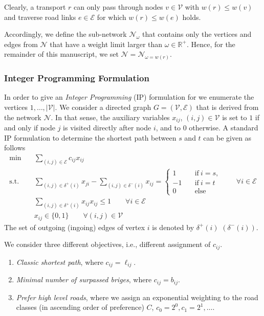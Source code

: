 Clearly, a transport $r$ can only pass through nodes $v \in \mathcal{V}$ with
$w(r) \leq w(v)$ and traverse road links $e \in \mathcal{E}$ for which $w(r) \leq w(e)$ holds.

Accordingly, we define the sub-network $\mathcal{N}_{\omega}$ that contains only the vertices and edges from $\mathcal{N}$ that have a weight limit larger than $\omega \in \mathbb{R}^{+}$.
Hence, for the remainder of this manuscript, we set $\mathcal{N}=\mathcal{N}_{\omega=w(r)}$.

\subsubsection{Integer Programming Formulation}
In order to give an \emph{Integer Programming} (IP) formulation for we enumerate the
vertices $1,\ldots,|\mathcal{V}|$. We consider a directed graph $G=(\mathcal{V},\mathcal{E})$ that is derived from the network $\mathcal{N}$.
In that sense, the auxiliary variables $x_{ij}$, $(i,j) \in \mathcal{V}$
is set to $1$ if and only if node $j$ is visited directly after node $i$, and to $0$ otherwise.
A standard IP formulation to determine the shortest path between $s$ and $t$ can be given as follows
\begin{align}
  \min \quad &\sum_{(i,j)\in \mathcal{E}}  c_{ij} x_{ij} \label{obj} \\
  \text{s.t.}\quad &
  \sum_{(i,j)\in \delta^{+} (i)} x_{ji} - \sum_{(i,j)\in \delta^{-}(i)} x_{ij} =
  \begin{cases}
    1 \quad& \text{if}~ i=s, \\
    -1 \quad& \text{if}~ i=t \\
    0 \quad&\text{else}
  \end{cases}
  \qquad \forall i \in \mathcal{E}
  \\
  &  \sum_{(i,j)\in \delta^{+} (i)} x_{ij}   x_ {ij} \leq 1     \qquad \forall i \in \mathcal{E}\\
  &  x_{ij} \in \{0,1\}   \qquad \forall (i,j) \in \mathcal{V}
\end{align}
The set of outgoing (ingoing) edges of vertex $i$ is denoted by  $\delta^{+} (i)$  $(\delta^{-} (i))$.


We consider three different objectives, i.e., different assignment of $c_{ij}$.
\begin{enumerate}
  \item \emph{Classic shortest path}, where $c_{ij}=\ell_{ij}$. \label{obj_short}
  \item \emph{Minimal number of surpassed briges}, where  $c_{ij}=b_{ij}$.  \label{obj_minBridge}
  \item \emph{Prefer high level roads}, where we assign an exponential weighting to the road classes (in ascending order of preference) $C$, $c_0=2^0,c_1=2^1, \ldots$.  \label{obj_highLevelRoad}
\end{enumerate}


